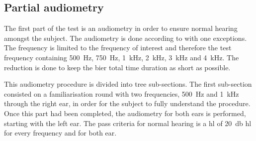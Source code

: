 \subsection{Partial audiometry}
The first part of the test is an audiometry in order to ensure normal hearing amongst the subject. The audiometry is done according to \citep{iso_8253-2} with one exceptions. The frequency is limited to the frequency of interest and therefore the test frequency containing \SI{500}{\hertz}, \SI{750}{\hertz}, \SI{1}{\kilo\hertz}, \SI{2}{\kilo\hertz}, \SI{3}{\kilo\hertz} and \SI{4}{\kilo\hertz}. The reduction is done to keep the \gls{bier} total time duration as short as possible.

This audiometry procedure is divided into tree sub-sections. The first sub-section consisted on a familiarisation round with two frequencies, \SI{500}{\hertz} and \SI{1}{\kilo\hertz} through the right ear, in order for the subject to fully understand the procedure. Once this part had been completed, the audiometry for both ears is performed, starting with the left ear. The pass criteria for normal hearing is a \gls{hl} of \SI{20}{\decibel} \gls{hl} for every frequency and for both ear.
   
